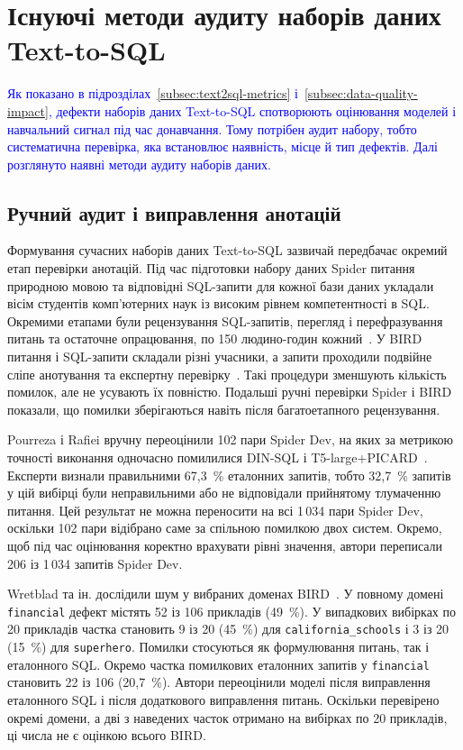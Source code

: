 \documentclass[a4paper,14pt,oneside]{extreport}
\begin{document}
\section{Існуючі методи аудиту наборів даних Text-to-SQL}
\label{sec:annotation-audit}

\textcolor{blue}{Як показано в підрозділах~\ref{subsec:text2sql-metrics} і~\ref{subsec:data-quality-impact}, дефекти наборів даних Text-to-SQL спотворюють оцінювання моделей і навчальний сигнал під час донавчання. Тому потрібен аудит набору, тобто систематична перевірка, яка встановлює наявність, місце й тип дефектів. Далі розглянуто наявні методи аудиту наборів даних.}

\subsection{Ручний аудит і виправлення анотацій}
\label{subsec:manual-audit}

Формування сучасних наборів даних Text-to-SQL зазвичай передбачає окремий етап перевірки анотацій. Під час підготовки набору даних Spider питання природною мовою та відповідні SQL-запити для кожної бази даних укладали вісім студентів комп'ютерних наук із високим рівнем компетентності в SQL. Окремими етапами були рецензування SQL-запитів, перегляд і перефразування питань та остаточне опрацювання, по 150 людино-годин кожний~\cite{yu2018spider}. У BIRD питання і SQL-запити складали різні учасники, а запити проходили подвійне сліпе анотування та експертну перевірку~\cite{li2023bird}. Такі процедури зменшують кількість помилок, але не усувають їх повністю. Подальші ручні перевірки Spider і BIRD показали, що помилки зберігаються навіть після багатоетапного рецензування.

Pourreza і Rafiei вручну переоцінили 102 пари Spider Dev, на яких за метрикою точності виконання одночасно помилилися DIN-SQL і T5-large+PICARD~\cite{pourreza2023evaluating}. Експерти визнали правильними 67,3~\% еталонних запитів, тобто 32,7~\% запитів у цій вибірці були неправильними або не відповідали прийнятому тлумаченню питання. Цей результат не можна переносити на всі 1\,034 пари Spider Dev, оскільки 102 пари відібрано саме за спільною помилкою двох систем. Окремо, щоб під час оцінювання коректно врахувати рівні значення, автори переписали 206 із 1\,034 запитів Spider Dev.

Wretblad та ін. дослідили шум у вибраних доменах BIRD~\cite{wretblad2024noise}. У повному домені \texttt{financial} дефект містять 52 із 106 прикладів (49~\%). У випадкових вибірках по 20 прикладів частка становить 9 із 20 (45~\%) для \texttt{california\_schools} і 3 із 20 (15~\%) для \texttt{superhero}. Помилки стосуються як формулювання питань, так і еталонного SQL. Окремо частка помилкових еталонних запитів у \texttt{financial} становить 22 із 106 (20,7~\%). Автори переоцінили моделі після виправлення еталонного SQL і після додаткового виправлення питань. Оскільки перевірено окремі домени, а дві з наведених часток отримано на вибірках по 20 прикладів, ці числа не є оцінкою всього BIRD.
\end{document}
